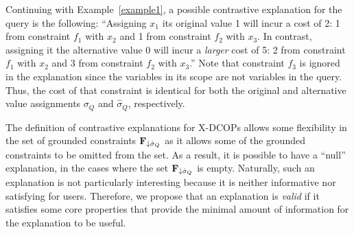 \documentclass[twoside,11pt]{article}
\begin{document}
\begin{example}
\label{example2}
Continuing with Example~\ref{example1}, a possible contrastive explanation for the query is the following: ``Assigning $x_1$ its original value 1 will incur a cost of 2: 1 from constraint $f_1$ with $x_2$ and 1 from constraint $f_2$ with $x_3$. In contrast, assigning it the alternative value 0 will incur a \emph{larger} cost of 5: 2 from constraint $f_1$ with $x_2$ and 3 from constraint $f_2$ with $x_3$.'' Note that constraint $f_3$ is ignored in the explanation since the variables in its scope are not variables in the query. Thus, the cost of that constraint is identical for both the original and alternative value assignments $\sigma_Q$ and $\hat{\sigma}_Q$, respectively.
\end{example}

The definition of contrastive explanations for X-DCOPs allows some flexibility in the set of grounded constraints ${\bf{F}}_{\downarrow \hat{\sigma}_Q}$ as it allows some of the grounded constraints to be omitted from the set. As a result, it is possible to have a ``null'' explanation, in the cases where the set ${\bf{F}}_{\downarrow \hat{\sigma}_Q}$ is empty. Naturally, such an explanation is not particularly interesting because it is neither informative nor satisfying for users. Therefore, we propose that an explanation is \emph{valid} if it satisfies some core properties that provide the minimal amount of information for the explanation to be useful.

\end{document}
